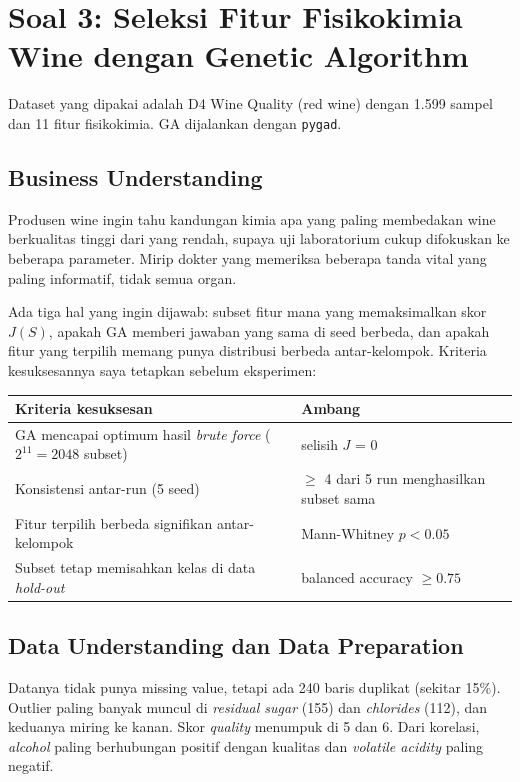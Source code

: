 \newpage
\section{Soal 3: Seleksi Fitur Fisikokimia Wine dengan Genetic Algorithm}

Dataset yang dipakai adalah D4 Wine Quality (red wine) dengan 1.599 sampel dan 11 fitur fisikokimia. GA dijalankan dengan \texttt{pygad}.

\subsection{Business Understanding}
Produsen wine ingin tahu kandungan kimia apa yang paling membedakan wine berkualitas tinggi dari yang rendah, supaya uji laboratorium cukup difokuskan ke beberapa parameter. Mirip dokter yang memeriksa beberapa tanda vital yang paling informatif, tidak semua organ.

Ada tiga hal yang ingin dijawab: subset fitur mana yang memaksimalkan skor $J(S)$, apakah GA memberi jawaban yang sama di seed berbeda, dan apakah fitur yang terpilih memang punya distribusi berbeda antar-kelompok. Kriteria kesuksesannya saya tetapkan sebelum eksperimen:

\begin{tabularx}{\textwidth}{@{}LL@{}}
\toprule
\textbf{Kriteria kesuksesan} & \textbf{Ambang} \\
\midrule
GA mencapai optimum hasil \emph{brute force} ($2^{11} = 2048$ subset) & selisih $J$ = 0 \\
Konsistensi antar-run (5 seed) & $\geq$ 4 dari 5 run menghasilkan subset sama \\
Fitur terpilih berbeda signifikan antar-kelompok & Mann-Whitney $p < 0.05$ \\
Subset tetap memisahkan kelas di data \emph{hold-out} & balanced accuracy $\geq 0.75$ \\
\bottomrule
\end{tabularx}

\subsection{Data Understanding dan Data Preparation}
Datanya tidak punya missing value, tetapi ada 240 baris duplikat (sekitar 15\%). Outlier paling banyak muncul di \textit{residual sugar} (155) dan \textit{chlorides} (112), dan keduanya miring ke kanan. Skor \textit{quality} menumpuk di 5 dan 6. Dari korelasi, \textit{alcohol} paling berhubungan positif dengan kualitas dan \textit{volatile acidity} paling negatif.

